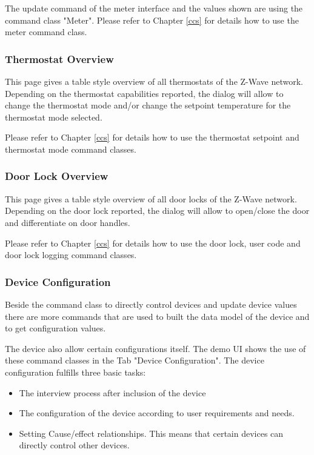 The update command of the meter interface and the values shown are using the command class "Meter". Please refer to Chapter \ref{ccs} for details how to use the meter command class.

\subsubsection{Thermostat Overview}

This page gives a table style overview of all thermostats of the Z-Wave network.  
Depending on the thermostat capabilities reported, the dialog will allow to change the thermostat mode and/or change the setpoint temperature 
for the thermostat mode selected.
 
Please refer to Chapter \ref{ccs} for details how to use the thermostat setpoint and thermostat mode command classes.

\subsubsection{Door Lock Overview}

This page gives a table style overview of all door locks of the Z-Wave network.  
Depending on the door lock reported, the dialog will allow to open/close the door
and differentiate on door handles.
 
Please refer to Chapter \ref{ccs} for details how to use the door lock, user code
and door lock logging command classes.


 
 
\subsubsection{Device Configuration} 
 
Beside the command class to directly control devices and update device values there are more 
commands that are used to built the data model of the device and to get configuration values. 

The device also allow certain configurations itself. The demo UI shows the use of these command classes in the Tab "Device Configuration". The device configuration fulfills three basic tasks:

\begin{itemize}
\item The interview process after inclusion of the device
\item The configuration of the device according to user requirements and needs.
\item Setting Cause/effect relationships. This means that certain devices can directly control other devices.

\end{itemize}


